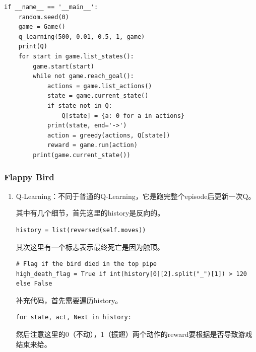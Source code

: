 \documentclass[a4paper, 11pt]{article}
\begin{document}
\begin{lstlisting}
if __name__ == '__main__':
    random.seed(0)
    game = Game()
    q_learning(500, 0.01, 0.5, 1, game)
    print(Q)
    for start in game.list_states():
        game.start(start)
        while not game.reach_goal():
            actions = game.list_actions()
            state = game.current_state()
            if state not in Q:
                Q[state] = {a: 0 for a in actions}
            print(state, end='->')
            action = greedy(actions, Q[state])
            reward = game.run(action)
        print(game.current_state())
\end{lstlisting}

\subsubsection{Flappy Bird}
\begin{enumerate}
\item Q-Learning：不同于普通的Q-Learning，它是跑完整个episode后更新一次Q。\cite{ref1}

其中有几个细节，首先这里的history是反向的。
\begin{lstlisting}
history = list(reversed(self.moves))
\end{lstlisting}
其次这里有一个标志表示最终死亡是因为触顶。
\begin{lstlisting}
# Flag if the bird died in the top pipe
high_death_flag = True if int(history[0][2].split("_")[1]) > 120 else False
\end{lstlisting}
补充代码，首先需要遍历history。
\begin{lstlisting}
for state, act, Next in history:
\end{lstlisting}
然后注意这里的0（不动），1（振翅）两个动作的reward要根据是否导致游戏结束来给。


\end{enumerate}
\end{document}
